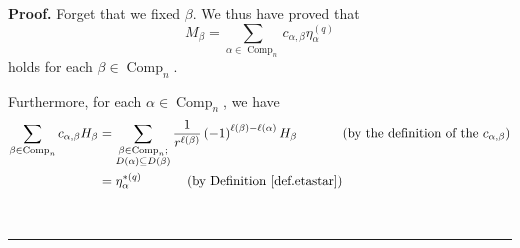 \documentclass[numbers=enddot,12pt,final,onecolumn,notitlepage]{scrartcl}%
\theoremstyle{definition}
\newenvironment{proof}[1][Proof]{\noindent\textbf{#1.} }{\ \rule{0.5em}{0.5em}}
\let\sumnonlimits\sum
\renewcommand{\sum}{\sumnonlimits\limits}
\newenvironment{vershort}{}{}
\begin{document}
\begin{proof}
Forget that we fixed $\beta$. We thus have proved that%
\begin{equation}
M_{\beta}=\sum_{\alpha\in\operatorname*{Comp}\nolimits_{n}}c_{\alpha,\beta
}\eta_{\alpha}^{\left(  q\right)  } \label{pf.prop.etastar-dual-basis.3}%
\end{equation}
holds for each $\beta\in\operatorname*{Comp}\nolimits_{n}$.

\begin{vershort}
Furthermore, for each $\alpha\in\operatorname*{Comp}\nolimits_{n}$, we have%
\begin{align*}
\sum_{\beta\in\operatorname*{Comp}\nolimits_{n}}c_{\alpha,\beta}H_{\beta}  &
=\sum_{\substack{\beta\in\operatorname*{Comp}\nolimits_{n};\\D\left(
\alpha\right)  \subseteq D\left(  \beta\right)  }}\dfrac{1}{r^{\ell\left(
\beta\right)  }}\left(  -1\right)  ^{\ell\left(  \beta\right)  -\ell\left(
\alpha\right)  }H_{\beta}\ \ \ \ \ \ \ \ \ \ \left(  \text{by the definition
of the }c_{\alpha,\beta}\right) \\
&  =\eta_{\alpha}^{\ast\left(  q\right)  }\ \ \ \ \ \ \ \ \ \ \left(  \text{by
Definition \ref{def.etastar}}\right)
\end{align*}

\end{vershort}


\end{proof}
\end{document}
